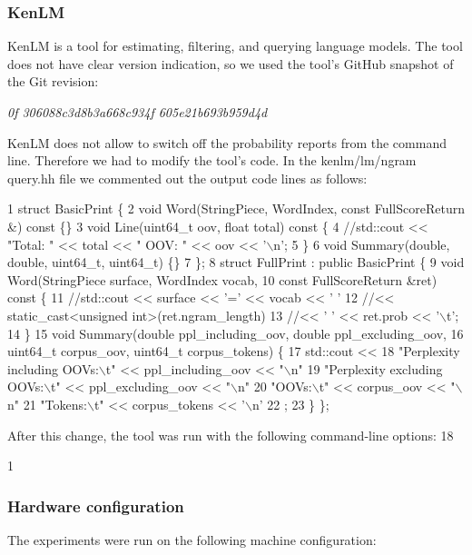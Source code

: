 \subsubsection*{Ken\+L\+M}

Ken\+L\+M is a tool for estimating, filtering, and querying language models. The tool does not have clear version indication, so we used the tool’s Git\+Hub snapshot of the Git revision\+:

{\itshape 0f 306088c3d8b3a668c934f 605e21b693b959d4d}

Ken\+L\+M does not allow to switch off the probability reports from the command line. Therefore we had to modify the tool’s code. In the {\ttfamily kenlm/lm/ngram query.\+hh} file we commented out the output code lines as follows\+:


\begin{DoxyCode}
1 struct BasicPrint \{
2   void Word(StringPiece, WordIndex, const FullScoreReturn &) const \{\}
3   void Line(uint64\_t oov, float total) const \{
4     //std::cout << "Total: " << total << " OOV: " << oov << ’\(\backslash\)n’;
5   \}
6   void Summary(double, double, uint64\_t, uint64\_t) \{\}
7 \};
8 struct FullPrint : public BasicPrint \{
9   void Word(StringPiece surface, WordIndex vocab,
10             const FullScoreReturn &ret) const \{
11     //std::cout << surface << ’=’ << vocab << ’ ’
12     //<< static\_cast<unsigned int>(ret.ngram\_length)
13     //<< ’ ’ << ret.prob << ’\(\backslash\)t’;
14 \}
15   void Summary(double ppl\_including\_oov, double ppl\_excluding\_oov,
16                uint64\_t corpus\_oov, uint64\_t corpus\_tokens) \{
17     std::cout <<
18       "Perplexity including OOVs:\(\backslash\)t" << ppl\_including\_oov << "\(\backslash\)n"
19       "Perplexity excluding OOVs:\(\backslash\)t" << ppl\_excluding\_oov << "\(\backslash\)n"
20       "OOVs:\(\backslash\)t" << corpus\_oov << "\(\backslash\)n"
21       "Tokens:\(\backslash\)t" << corpus\_tokens << ’\(\backslash\)n’
22       ;
23 \} \};
\end{DoxyCode}
 After this change, the tool was run with the following command-\/line options\+: 18 
\begin{DoxyCode}
1 %
\end{DoxyCode}


\subsubsection*{Hardware configuration}

The experiments were run on the following machine configuration\+:


